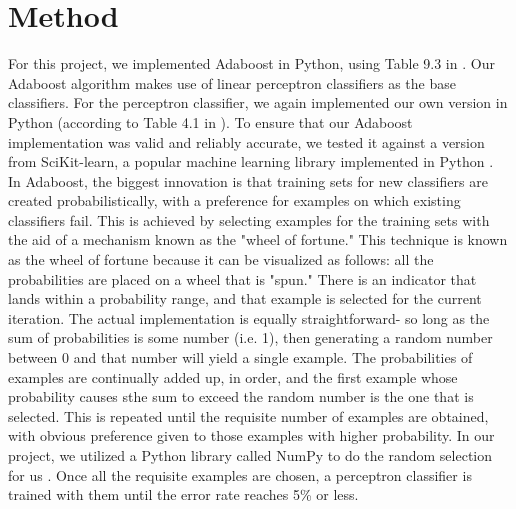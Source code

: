 \documentclass{article}
\begin{document}
\section{Method}

For this project, we implemented Adaboost in Python, using Table 9.3 in \cite{kubat}. Our Adaboost algorithm makes use of linear perceptron classifiers as the base classifiers. For the perceptron classifier, we again implemented our own version in Python (according to Table 4.1 in \cite{kubat}). To ensure that our Adaboost implementation was valid and reliably accurate, we tested it against a version from SciKit-learn, a popular machine learning library implemented in Python \cite{scikit}. \\

In Adaboost, the biggest innovation is that training sets for new classifiers are created probabilistically, with a preference for examples on which existing classifiers fail. This is achieved by selecting examples for the training sets with the aid of a mechanism known as the "wheel of fortune." This technique is known as the wheel of fortune because it can be visualized as follows: all the probabilities are placed on a wheel that is "spun." There is an indicator that lands within a probability range, and that example is selected for the current iteration. The actual implementation is equally straightforward- so long as the sum of probabilities is some number (i.e. 1), then generating a random number between 0 and that number will yield a single example. The probabilities of examples are continually added up, in order, and the first example whose probability causes sthe sum to exceed the random number is the one that is selected. This is repeated until the requisite number of examples are obtained, with obvious preference given to those examples with higher probability. In our project, we utilized a Python library called NumPy to do the random selection for us \cite{numpy}. Once all the requisite examples are chosen, a perceptron classifier is trained with them until the error rate reaches 5\% or less. \\
\end{document}
